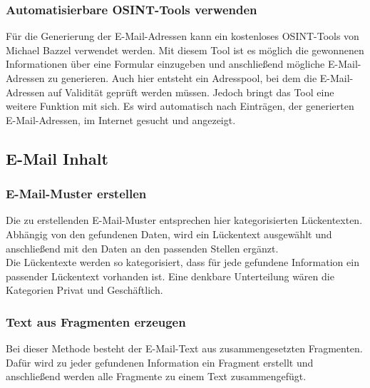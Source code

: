 		\subsubsection{Automatisierbare OSINT-Tools verwenden}
		Für die Generierung der E-Mail-Adressen kann ein kostenloses OSINT-Tools von Michael Bazzel verwendet werden. Mit diesem Tool ist es möglich die gewonnenen Informationen über eine Formular einzugeben und anschließend mögliche E-Mail-Adressen zu generieren. Auch hier entsteht ein Adresspool, bei dem die E-Mail-Adressen auf Validität geprüft werden müssen. Jedoch bringt das Tool eine weitere Funktion mit sich. Es wird automatisch nach Einträgen, der generierten E-Mail-Adressen, im Internet gesucht und angezeigt. 
	\subsection{E-Mail Inhalt}
		\subsubsection{E-Mail-Muster erstellen}
		Die zu erstellenden E-Mail-Muster entsprechen hier kategorisierten Lückentexten. Abhängig von den gefundenen Daten, wird ein Lückentext ausgewählt und anschließend mit den Daten an den passenden Stellen ergänzt.\\
		Die Lückentexte werden so kategorisiert, dass für jede gefundene Information ein passender Lückentext vorhanden ist. Eine denkbare Unterteilung wären die Kategorien Privat und Geschäftlich.
		\subsubsection{Text aus Fragmenten erzeugen}
		Bei dieser Methode besteht der E-Mail-Text aus zusammengesetzten Fragmenten. Dafür wird zu jeder gefundenen Information ein Fragment erstellt und anschließend werden alle Fragmente zu einem Text zusammengefügt.
		
		
		
